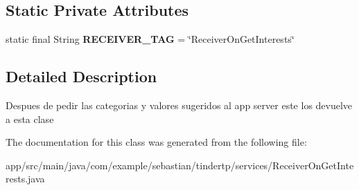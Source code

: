\subsection*{Static Private Attributes}
\begin{DoxyCompactItemize}
\item 
static final String {\bfseries R\+E\+C\+E\+I\+V\+E\+R\+\_\+\+T\+AG} = \char`\"{}Receiver\+On\+Get\+Interests\char`\"{}\hypertarget{classcom_1_1example_1_1sebastian_1_1tindertp_1_1services_1_1ReceiverOnGetInterests_a781d992299a85d455aa00e787c4a68df}{}\label{classcom_1_1example_1_1sebastian_1_1tindertp_1_1services_1_1ReceiverOnGetInterests_a781d992299a85d455aa00e787c4a68df}

\end{DoxyCompactItemize}


\subsection{Detailed Description}
Despues de pedir las categorias y valores sugeridos al app server este los devuelve a esta clase 

The documentation for this class was generated from the following file\+:\begin{DoxyCompactItemize}
\item 
app/src/main/java/com/example/sebastian/tindertp/services/Receiver\+On\+Get\+Interests.\+java\end{DoxyCompactItemize}

